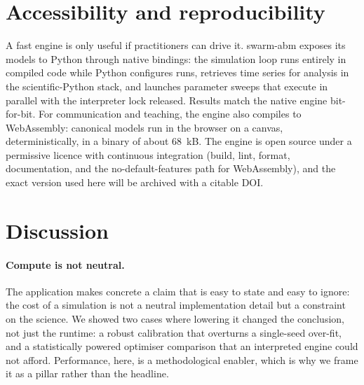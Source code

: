 \documentclass[review]{elsarticle}
\begin{document}
\section{Accessibility and reproducibility}
\label{sec:access}

A fast engine is only useful if practitioners can drive it. swarm-abm exposes
its models to Python through native bindings: the simulation loop runs entirely
in compiled code while Python configures runs, retrieves time series for
analysis in the scientific-Python stack, and launches parameter sweeps that
execute in parallel with the interpreter lock released. Results match the native
engine bit-for-bit. For communication and teaching, the engine also compiles to
WebAssembly: canonical models run in the browser on a canvas, deterministically,
in a binary of about 68~kB. The engine is open source under a permissive licence
with continuous integration (build, lint, format, documentation, and the
no-default-features path for WebAssembly), and the exact version used here will
be archived with a citable DOI. %

\section{Discussion}
\label{sec:discussion}

\paragraph{Compute is not neutral.}
The application makes concrete a claim that is easy to state and easy to ignore:
the cost of a simulation is not a neutral implementation detail but a constraint
on the science. We showed two cases where lowering it changed the conclusion,
not just the runtime: a robust calibration that overturns a single-seed
over-fit, and a statistically powered optimiser comparison that an interpreted
engine could not afford. Performance, here, is a methodological enabler, which
is why we frame it as a pillar rather than the headline.
\end{document}
